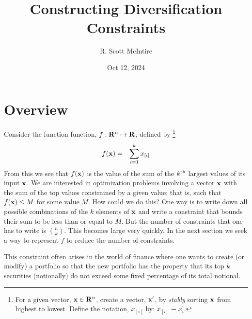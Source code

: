 \documentclass[12pt]{article}
\title{Constructing Diversification Constraints}
\author{R. Scott McIntire}
\date{Oct 12, 2024}
\begin{document}
\maketitle

\section{Overview}
Consider the function function, $f: {\bf R}^n \mapsto {\bf R}$, defined by%
\footnote{
For a given vector, ${\bf x} \in {\bf R}^n$, create a vector,  
${\bf x}^\prime$,
by {\it stably\/} sorting ${\bf x}$ from highest to lowest.
Define the notation, $x_{[i]}$ by: $x_{[i]} \equiv x_{i}^\prime$.}
\begin{eqnarray}
	f({\bf x}) & = & \sum_{i=1}^k x_{[i]} 
\end{eqnarray}
From this we see that $f({\bf x})$ is the value of the sum of the $k^{\rm th}$ 
largest values of its input ${\bf x}$.
We are interested in optimization problems involving a vector ${\bf x}$ 
with the sum of the top values constrained by a given value; that is, 
such that $f({\bf x}) \le M$  for some value $M$.
How could we do this? One way is to write down all possible combinations of the 
$k$ elements of ${\bf x}$ and write a constraint that bounds their sum to be 
less than or equal to $M$.  But the number of constraints that one has to 
write is $n \choose k$. This becomes large very quickly. 
In the next section we seek a way to represent $f$ to 
reduce the number of constraints.

This constraint often arises in the world of finance where one wants to 
create (or modify) a portfolio so that the new portfolio has the property
that its top $k$ securities (notionally) do not exceed some fixed percentage 
of its total notional.
\end{document}

